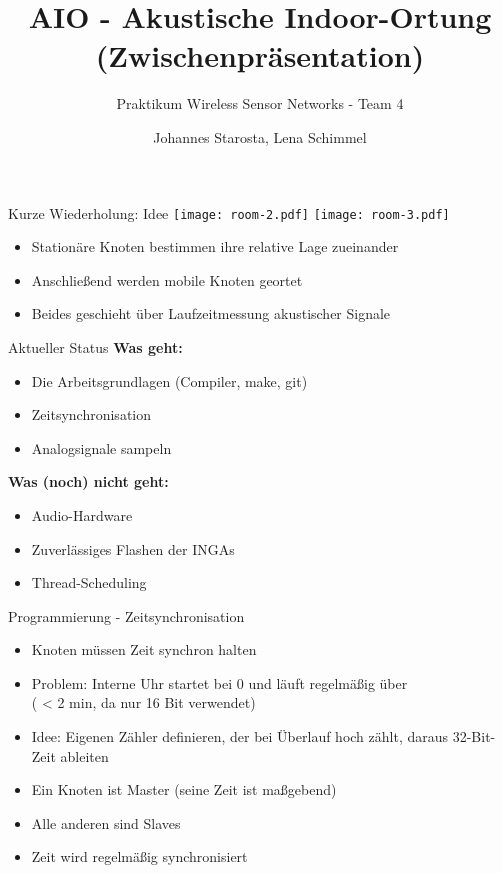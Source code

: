 \documentclass[fleqn,11pt]{beamer}
\title{AIO - Akustische Indoor-Ortung \\(Zwischenpräsentation)}
\subtitle{Praktikum Wireless Sensor Networks - Team 4}
\author{Johannes Starosta, Lena Schimmel}
\begin{document}
\begin{frame}[plain]
\titlepage
\end{frame}

\begin{frame}{Kurze Wiederholung: Idee}
	\texttt{[image: room-2.pdf]}
	\texttt{[image: room-3.pdf]}

	\begin{itemize}
		\item Stationäre Knoten bestimmen ihre relative Lage zueinander
		\item Anschließend werden mobile Knoten geortet
		\item Beides geschieht über Laufzeitmessung akustischer Signale
	\end{itemize}
\end{frame}

\begin{frame}{Aktueller Status}
	\textbf{Was geht:}
	\begin{itemize}
		\item Die Arbeitsgrundlagen (Compiler, make, git)
		\item Zeitsynchronisation
		\item Analogsignale sampeln
	\end{itemize}
	
	\textbf{Was (noch) nicht geht:}
	\begin{itemize}
		\item Audio-Hardware
		\item Zuverlässiges Flashen der INGAs
		\item Thread-Scheduling
	\end{itemize}
\end{frame}

\begin{frame}{Programmierung - Zeitsynchronisation}

	\begin{itemize}
		\item Knoten müssen Zeit synchron halten
		\item Problem: Interne Uhr startet bei 0 und läuft regelmäßig über \\( < 2 min, da nur 16 Bit verwendet)
		\item Idee: Eigenen Zähler definieren, der bei Überlauf hoch zählt, daraus 32-Bit-Zeit ableiten
		\item Ein Knoten ist Master (seine Zeit ist maßgebend)
		\item Alle anderen sind  Slaves
		\item Zeit wird regelmäßig synchronisiert
	\end{itemize}
\end{frame}
\end{document}
